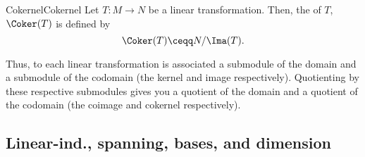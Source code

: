 \begin{dfn}{Cokernel}{Cokernel}
Let $T\colon M\rightarrow N$ be a linear transformation.  Then, the  of $T$, $\Coker (T)$ is defined by
\begin{equation}
\Coker (T)\ceqq N/\Ima (T).
\end{equation}
\end{dfn}
Thus, to each linear transformation is associated a submodule of the domain and a submodule of the codomain (the kernel and image respectively).  Quotienting by these respective submodules gives you a quotient of the domain and a quotient of the codomain (the coimage and cokernel respectively).

\subsection{Linear-ind., spanning, bases, and dimension}


